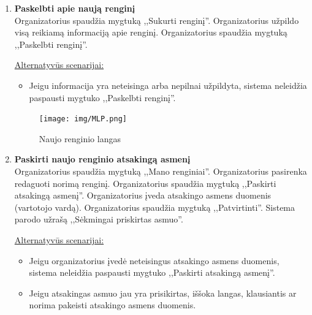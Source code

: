\documentclass{VUMIFPSkursinis}
\begin{document}
\begin{enumerate} [label = \textbf{U\arabic*.}]
				\underline{Alternatyvūs scenarijai:}
				\begin{itemize}
					\item Jeigu įvykusių renginių nėra, vietoj renginių sąrašo rodomas užrašas ,,Jau įvykusių renginių nėra''.
					\item Jeigu jau įvykusių renginių yra 15 ar mažiau, puslapių numeriai nerodomi, nes visi renginiai telpa viename puslapyje.
				\end{itemize}

				\begin{figure}[H]
					\centering
					\texttt{[image: img/MLP.png]}
					\caption{Jau įvykusių renginių sąrašo langas}
					\label{fig:matyti-jau-ivykusius-renginius}
				\end{figure}
			
			\item \textbf{Paskelbti apie naują renginį} \\
				Organizatorius spaudžia mygtuką ,,Sukurti renginį''. 
				Organizatorius užpildo visą reikiamą informaciją apie renginį.
				Organizatorius spaudžia mygtuką ,,Paskelbti renginį''.
				
				\underline{Alternatyvūs scenarijai:}
				\begin{itemize}
					\item Jeigu informacija yra neteisinga arba nepilnai užpildyta, sistema neleidžia paspausti mygtuko ,,Paskelbti renginį''.
				\end{itemize}
				
				\begin{figure}[H]
					\centering
					\texttt{[image: img/MLP.png]}
					\caption{Naujo renginio langas}
					\label{fig:paskelbti-nauja-rengini}
				\end{figure}
				
			\item \textbf{Paskirti naujo renginio atsakingą asmenį} \\
				Organizatorius spaudžia mygtuką ,,Mano renginiai''. 
				Organizatorius pasirenka redaguoti norimą renginį.
				Organizatorius spaudžia mygtuką ,,Paskirti atsakingą asmenį''. 
				Organizatorius įveda atsakingo asmens duomenis (vartotojo vardą).
				Organizatorius spaudžia mygtuką ,,Patvirtinti''.
				Sistema parodo užrašą ,,Sėkmingai priskirtas asmuo''.
				
				\underline{Alternatyvūs scenarijai:}
				\begin{itemize}
					\item Jeigu organizatorius įvedė neteisingus atsakingo asmens duomenis, sistema neleidžia paspausti mygtuko ,,Paskirti atsakingą asmenį''.
					\item Jeigu atsakingas asmuo jau yra prisikirtas, iššoka langas, klausiantis ar norima pakeisti atsakingo asmens duomenis.
				\end{itemize}
				

\end{enumerate}
\end{document}
